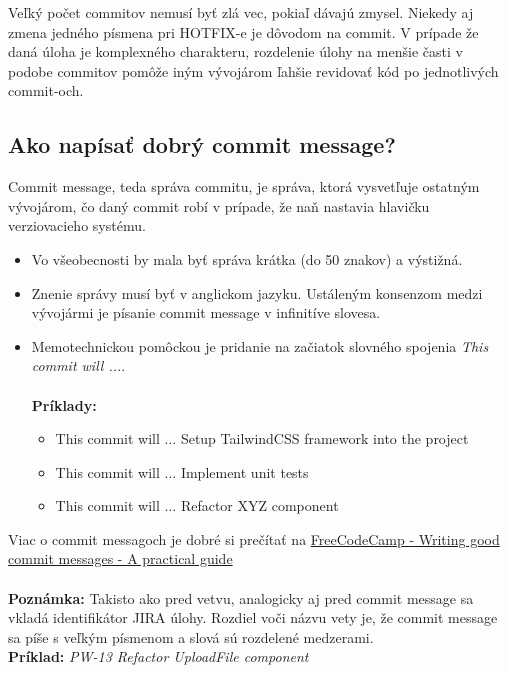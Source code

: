 \documentclass{article}
\begin{document}
            \noindent \textnormal{%
            Veľký počet commitov nemusí byť zlá vec, pokiaľ dávajú zmysel. Niekedy aj zmena jedného písmena pri HOTFIX-e je dôvodom na commit. V prípade že daná úloha je komplexného charakteru, rozdelenie úlohy na menšie časti v podobe commitov pomôže iným vývojárom ľahšie revidovať kód po jednotlivých commit-och.
            }

        \vspace*{.5cm}
        \subsection*{Ako napísať dobrý commit message?}

            \textnormal{Commit message, teda správa commitu, je správa, ktorá vysvetľuje ostatným vývojárom, čo daný commit robí v prípade, že naň nastavia hlavičku verziovacieho systému.}

            \begin{itemize}
                \item Vo všeobecnosti by mala byť správa krátka (do 50 znakov) a výstižná.
                \item Znenie správy musí byť v anglickom jazyku. Ustáleným konsenzom medzi vývojármi je písanie commit message v infinitíve slovesa.
                \item Memotechnickou pomôckou je pridanie na začiatok slovného spojenia \emph{This commit will ...}.\\\\
                \textbf{Príklady:}
                \begin{itemize}
                    \item This commit will ... Setup TailwindCSS framework into the project
                    \item This commit will ... Implement unit tests
                    \item This commit will ... Refactor XYZ component
                \end{itemize}
            \end{itemize}



            \noindent \textnormal{%
            Viac o commit messagoch je dobré si prečítať na
            \href{https://www.freecodecamp.org/news/writing-good-commit-messages-a-practical-guide/}{FreeCodeCamp - Writing good commit messages - A practical guide} \\\\
            \textbf{Poznámka:} Takisto ako pred vetvu, analogicky aj pred commit message sa vkladá identifikátor JIRA úlohy. Rozdiel voči názvu vety je, že commit message sa píše s veľkým písmenom a slová sú rozdelené medzerami. \\
            \textbf{Príklad:} \emph{PW-13 Refactor UploadFile component}
            }
    
\end{document}
